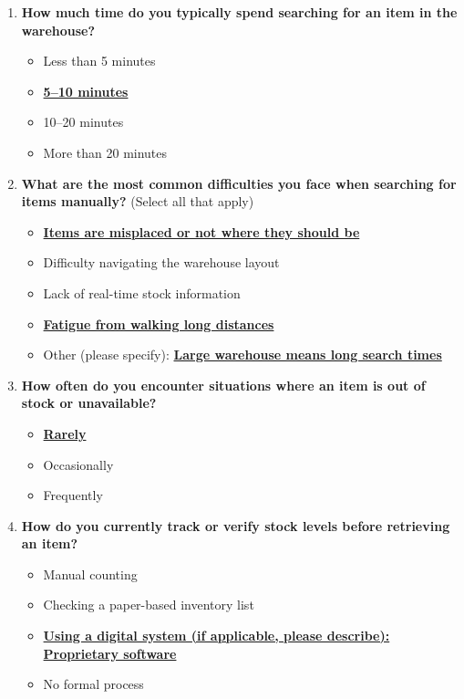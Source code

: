 \begin{enumerate}
    \item \textbf{How much time do you typically spend searching for an item in the warehouse?}
    \begin{itemize}
        \item Less than 5 minutes
        \item \textbf{\underline{5–10 minutes}}
        \item 10–20 minutes
        \item More than 20 minutes
    \end{itemize}

    \item \textbf{What are the most common difficulties you face when searching for items manually?} (Select all that apply)
    \begin{itemize}
        \item \textbf{\underline{Items are misplaced or not where they should be}}
        \item Difficulty navigating the warehouse layout
        \item Lack of real-time stock information
        \item \textbf{\underline{Fatigue from walking long distances}}
        \item Other (please specify): \underline{\textbf{Large warehouse means long search times}}
    \end{itemize}

    \item \textbf{How often do you encounter situations where an item is out of stock or unavailable?}
    \begin{itemize}
        \item \textbf{\underline{Rarely}}
        \item Occasionally
        \item Frequently
    \end{itemize}

    \item \textbf{How do you currently track or verify stock levels before retrieving an item?}
    \begin{itemize}
        \item Manual counting
        \item Checking a paper-based inventory list
        \item \textbf{\underline{Using a digital system (if applicable, please describe): }}\underline{\textbf{Proprietary software}}
        \item No formal process
    \end{itemize}


\end{enumerate}
